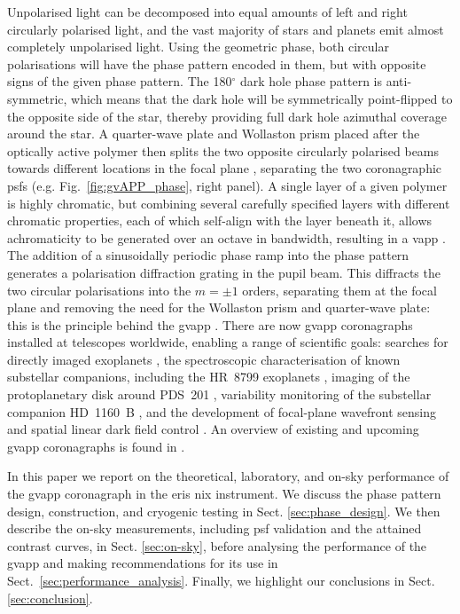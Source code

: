 \documentclass{aa}
\begin{document}
Unpolarised light can be decomposed into equal amounts of left and right circularly polarised light, and the vast majority of stars and planets emit almost completely unpolarised light.
%
Using the geometric phase, both circular polarisations will have the phase pattern encoded in them, but with opposite signs of the given phase pattern.
%
The 180$^\circ$ dark hole phase pattern is anti-symmetric, which means that the dark hole will be symmetrically point-flipped to the opposite side of the star, thereby providing full dark hole azimuthal coverage around the star.
%
A quarter-wave plate and Wollaston prism placed after the optically active polymer then splits the two opposite circularly polarised beams towards different locations in the focal plane \citep{Otten14}, separating the two coronagraphic \acp{psf} (e.g. Fig.~\ref{fig:gvAPP_phase}, right panel).
%
A single layer of a given polymer is highly chromatic, but combining several carefully specified layers with different chromatic properties, each of which self-align with the layer beneath it, allows achromaticity to be generated over an octave in bandwidth, resulting in a \acl{vapp} \citep[\acs{vapp};][]{Snik12}.
 The addition of a sinusoidally periodic phase ramp into the phase pattern generates a polarisation diffraction grating in the pupil beam.
%
This diffracts the two circular polarisations into the $m=\pm1$ orders, separating them at the focal plane and removing the need for the Wollaston prism and quarter-wave plate: this is the principle behind the \acl{gvapp} \citep[\acs{gvapp};][]{otten2017sky}.
There are now \ac{gvapp} coronagraphs installed at telescopes worldwide, enabling a range of scientific goals: searches for directly imaged exoplanets \citep{2018SPIE10703E..2TL, 2023AJ....165..216L, 2025A&A...693A..81B, 2025MNRAS.536.1455M}, the spectroscopic characterisation of known substellar companions, including the HR~8799 exoplanets \citep{2021MNRAS.506.3224S, 2022AJ....163..217D}, imaging of the protoplanetary disk around PDS~201 \citep{2020AJ....159..252W}, variability monitoring of the substellar companion HD~1160~B \citep{2023MNRAS.520.4235S, 2024MNRAS.531.2168S}, and the development of focal-plane wavefront sensing and spatial linear dark field control \citep{2019A&A...632A..48B, 2019JATIS...5d9004M, 2021A&A...646A.145M}.
%
An overview of existing and upcoming \ac{gvapp} coronagraphs is found in \citet{2021ApOpt..60D..52D}.

In this paper we report on the theoretical, laboratory, and on-sky performance of the \ac{gvapp} coronagraph in the \ac{eris} \ac{nix} instrument.
%
We discuss the phase pattern design, construction, and cryogenic testing in Sect. \ref{sec:phase_design}.
%
We then describe the on-sky measurements, including \ac{psf} validation and the attained contrast curves, in Sect. \ref{sec:on-sky}, before analysing the performance of the \ac{gvapp} and making recommendations for its use in Sect.~\ref{sec:performance_analysis}.
%
Finally, we highlight our conclusions in Sect. \ref{sec:conclusion}.
\end{document}
